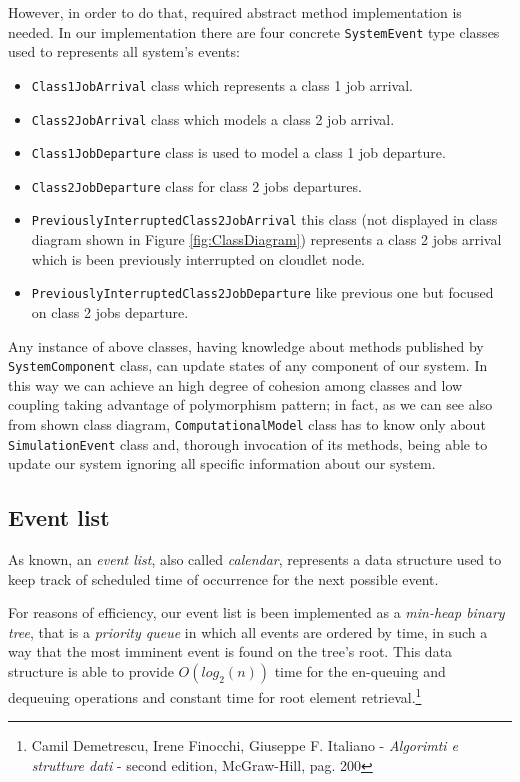 \documentclass[10pt,a4paper]{article}
\begin{document}
However, in order to do that, required abstract method implementation is needed. In our implementation there are four concrete \texttt{SystemEvent} type classes used to represents all system's events:

\begin{itemize}
\item \texttt{Class1JobArrival} class which represents a class 1 job arrival.
\item \texttt{Class2JobArrival} class which models a class 2 job arrival.
\item \texttt{Class1JobDeparture} class is used to model a class 1 job departure.
\item \texttt{Class2JobDeparture} class for class 2 jobs departures.
\item \texttt{PreviouslyInterruptedClass2JobArrival} this class (not displayed in class diagram shown in Figure \ref{fig:ClassDiagram}) represents a class 2 jobs arrival which is been previously interrupted on cloudlet node.
\item \texttt{PreviouslyInterruptedClass2JobDeparture} like previous one but focused on class 2 jobs departure.
\end{itemize}

Any instance of above classes, having knowledge about methods published by \texttt{SystemComponent} class, can update states of any component of our system. In this way we can achieve an high degree of cohesion among classes and low coupling taking advantage of polymorphism pattern; in fact, as we can see also from shown class diagram, \texttt{ComputationalModel} class has to know only about \texttt{SimulationEvent} class and, thorough invocation of its methods, being able to update our system ignoring all specific information about our system.

\subsection{Event list}

As known, an \textit{event list}, also called \textit{calendar}, represents a data structure used to keep track of scheduled time of occurrence for the next possible event.

For reasons of efficiency, our event list is been implemented as a \textit{min-heap binary tree}, that is a \textit{priority queue} in which all events are ordered by time, in such a way that the most imminent event is found on the tree's root. This data structure is able to provide $O(log_2(n))$ time for the en-queuing and dequeuing operations and constant time for root element retrieval.\footnote{Camil Demetrescu, Irene Finocchi, Giuseppe F. Italiano - \textit{Algorimti e strutture dati} - second edition, McGraw-Hill, pag. 200} 
\end{document}

